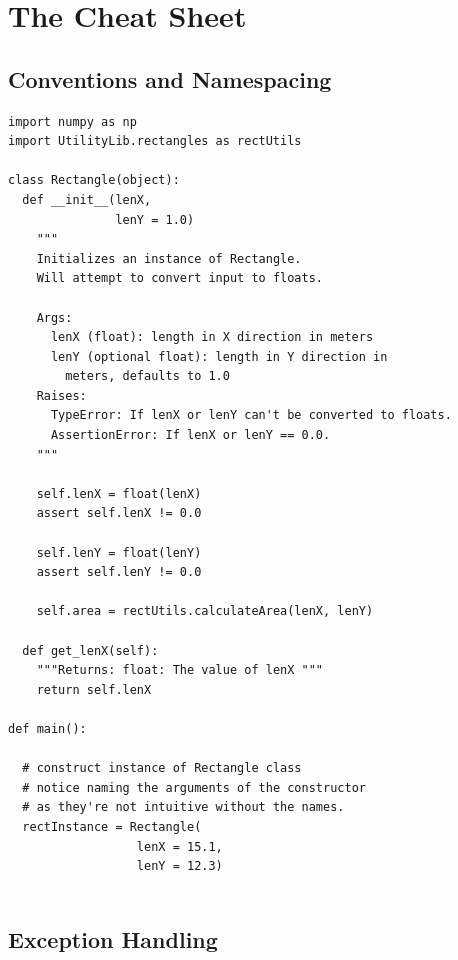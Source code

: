 \documentclass[10pt,a4paper]{article}
\begin{document}
\newpage
\section{The Cheat Sheet}

\subsection{Conventions and Namespacing}
\begin{lstlisting}
import numpy as np
import UtilityLib.rectangles as rectUtils

class Rectangle(object):
  def __init__(lenX, 
               lenY = 1.0) 
    """
    Initializes an instance of Rectangle. 
    Will attempt to convert input to floats.
    
    Args: 
      lenX (float): length in X direction in meters
      lenY (optional float): length in Y direction in 
        meters, defaults to 1.0
    Raises:
      TypeError: If lenX or lenY can't be converted to floats.
      AssertionError: If lenX or lenY == 0.0.
    """
    
    self.lenX = float(lenX)
    assert self.lenX != 0.0
    
    self.lenY = float(lenY)
    assert self.lenY != 0.0

    self.area = rectUtils.calculateArea(lenX, lenY)

  def get_lenX(self):
    """Returns: float: The value of lenX """
    return self.lenX

def main():

  # construct instance of Rectangle class
  # notice naming the arguments of the constructor 
  # as they're not intuitive without the names.
  rectInstance = Rectangle(
                  lenX = 15.1, 
                  lenY = 12.3)
	
\end{lstlisting}

\newpage
\subsection{Exception Handling}
\end{document}
